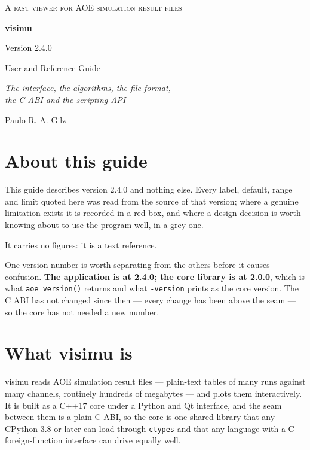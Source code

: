 \documentclass[11pt,a4paper,oneside]{report}
\newcommand{\appver}{2.4.0}
\newcommand{\code}[1]{\texttt{#1}}
\begin{document}
\begin{titlepage}
\centering
\vspace*{3cm}
{\small\scshape\color{aoeaccent} A fast viewer for AOE simulation result files\par}
\vspace{2.2cm}
{\Huge\bfseries visimu\par}
\vspace{0.5cm}
{\Large Version \appver\par}
\vspace{2.4cm}
{\LARGE User and Reference Guide\par}
\vspace{0.6cm}
{\large\itshape The interface, the algorithms, the file format,\\
the C ABI and the scripting API\par}
\vspace{3cm}
{\large Paulo R. A. Gilz\par}
\vfill
\end{titlepage}

\tableofcontents
\clearpage

\chapter*{About this guide}

This guide describes version \appver{} and nothing else. Every label, default,
range and limit quoted here was read from the source of that version; where a
genuine limitation exists it is recorded in a red box, and where a design
decision is worth knowing about to use the program well, in a grey one.

It carries no figures: it is a text reference.

One version number is worth separating from the others before it causes
confusion. \textbf{The application is at \appver; the core library is at
2.0.0}, which is what \code{aoe\_version()} returns and what \code{-version}
prints as the core version. The C ABI has not changed since then --- every
change has been above the seam --- so the core has not needed a new number.

\chapter{What visimu is}

visimu reads AOE simulation result files --- plain-text tables of many runs
against many channels, routinely hundreds of megabytes --- and plots them
interactively. It is built as a C++17 core under a Python and Qt interface, and
the seam between them is a plain C ABI, so the core is one shared library that
any CPython 3.8 or later can load through \code{ctypes} and that any language
with a C foreign-function interface can drive equally well.
\end{document}
